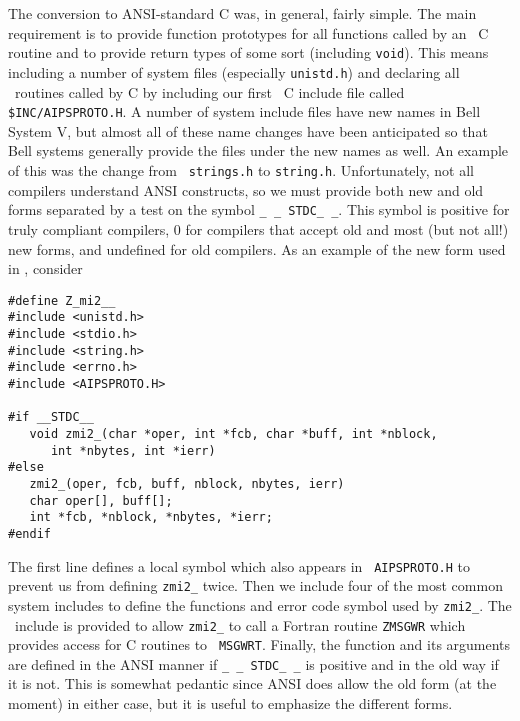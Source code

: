 The conversion to ANSI-standard C was, in general, fairly simple.  The
main requirement is to provide function prototypes for all functions
called by an \AIPS\ C routine and to provide return types of some sort
(including {\tt void}).  This means including a number of system files
(especially {\tt unistd.h}) and declaring all \AIPS\ routines called
by C by including our first \AIPS\ C include file called \hbox{{\tt
\$INC/AIPSPROTO.H}}.  A number of system include files have new names
in Bell System V, but almost all of these name changes have been
anticipated so that Bell systems generally provide the files under the
new names as well.  An example of this was the change from {\tt
strings.h} to {\tt string.h}.  Unfortunately, not all compilers
understand ANSI constructs, so we must provide both new and old forms
separated by a test on the symbol {\tt \_\,\_\,STDC\_\,\_}.  This symbol is
positive for truly compliant compilers, 0 for compilers that accept
old and most (but not all!) new forms, and undefined for old
compilers.  As an example of the new form used in \AIPS, consider
\begin{verbatim}
#define Z_mi2__
#include <unistd.h>
#include <stdio.h>
#include <string.h>
#include <errno.h>
#include <AIPSPROTO.H>

#if __STDC__
   void zmi2_(char *oper, int *fcb, char *buff, int *nblock,
      int *nbytes, int *ierr)
#else
   zmi2_(oper, fcb, buff, nblock, nbytes, ierr)
   char oper[], buff[];
   int *fcb, *nblock, *nbytes, *ierr;
#endif
\end{verbatim}
The first line defines a local symbol which also appears in {\tt
AIPSPROTO.H} to prevent us from defining {\tt zmi2\_} twice.  Then we
include four of the most common system includes to define the
functions and error code symbol used by {\tt zmi2\_}.  The \AIPS\
include is provided to allow {\tt zmi2\_} to call a Fortran routine
{\tt ZMSGWR} which provides access for C routines to \hbox{{\tt
MSGWRT}}.  Finally, the function and its arguments are defined in the
ANSI manner if {\tt \_\,\_\,STDC\_\,\_} is positive and in the old way if it
is not.  This is somewhat pedantic since ANSI does allow the old form
(at the moment) in either case, but it is useful to emphasize the
different forms.

